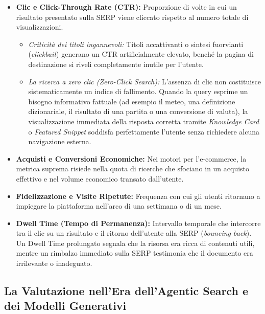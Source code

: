 \begin{itemize}
    \item \textbf{Clic e Click-Through Rate (CTR):} Proporzione di volte in cui un risultato presentato sulla SERP viene cliccato rispetto al numero totale di visualizzazioni.
    \begin{itemize}
        \item \textit{Criticit\`a dei titoli ingannevoli:} Titoli accattivanti o sintesi fuorvianti (\textit{clickbait}) generano un CTR artificialmente elevato, benché la pagina di destinazione si riveli completamente inutile per l'utente.
        \item \textit{La ricerca a zero clic (\textit{Zero-Click Search}):} L'assenza di clic non costituisce sistematicamente un indice di fallimento. Quando la query esprime un bisogno informativo fattuale (ad esempio il meteo, una definizione dizionariale, il risultato di una partita o una conversione di valuta), la visualizzazione immediata della risposta corretta tramite \textit{Knowledge Card} o \textit{Featured Snippet} soddisfa perfettamente l'utente senza richiedere alcuna navigazione esterna.
    \end{itemize}
    \item \textbf{Acquisti e Conversioni Economiche:} Nei motori per l'e-commerce, la metrica suprema risiede nella quota di ricerche che sfociano in un acquisto effettivo e nel volume economico transato dall'utente.
    \item \textbf{Fidelizzazione e Visite Ripetute:} Frequenza con cui gli utenti ritornano a impiegare la piattaforma nell'arco di una settimana o di un mese.
    \item \textbf{Dwell Time (Tempo di Permanenza):} Intervallo temporale che intercorre tra il clic su un risultato e il ritorno dell'utente alla SERP (\textit{bouncing back}). Un Dwell Time prolungato segnala che la risorsa era ricca di contenuti utili, mentre un rimbalzo immediato sulla SERP testimonia che il documento era irrilevante o inadeguato.
\end{itemize}

\FloatBarrier
\subsection{La Valutazione nell'Era dell'Agentic Search e dei Modelli Generativi}
\label{subsec:valutazione-era-generativa}

